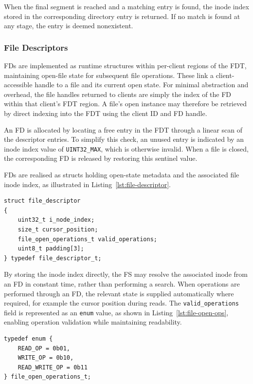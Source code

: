 When the final segment is reached and a matching entry is found, the inode index stored in the corresponding directory entry is returned. If no match is found at any stage, the entry is deemed nonexistent. 

\subsubsection{File Descriptors}
FDs are implemented as runtime structures within per-client regions of the FDT, maintaining open-file state for subsequent file operations. These link a client-accessible handle to a file and its current open state. For minimal abstraction and overhead, the file handles returned to clients are simply the index of the FD within that client’s FDT region. A file’s open instance may therefore be retrieved by direct indexing into the FDT using the client ID and FD handle.

An FD is allocated by locating a free entry in the FDT through a linear scan of the descriptor entries. To simplify this check, an unused entry is indicated by an inode index value of \texttt{UINT32\_MAX}, which is otherwise invalid. When a file is closed, the corresponding FD is released by restoring this sentinel value. 

FDs are realised as structs holding open-state metadata and the associated file inode index, as illustrated in Listing~\ref{lst:file-descriptor}.

\vspace{0.5cm}
\begin{lstlisting}[caption={File descriptor structure.}, label={lst:file-descriptor}]
struct file_descriptor
{
    uint32_t i_node_index;
    size_t cursor_position;
    file_open_operations_t valid_operations;
    uint8_t padding[3];
} typedef file_descriptor_t;
\end{lstlisting}

By storing the inode index directly, the FS may resolve the associated inode from an FD in constant time, rather than performing a search. When operations are performed through an FD, the relevant state is supplied automatically where required, for example the cursor position during reads. The \texttt{valid\_operations} field is represented as an \texttt{enum} value, as shown in Listing~\ref{lst:file-open-ops}, enabling operation validation while maintaining readability. 

\vspace{0.5cm}
\begin{lstlisting}[caption={File open operations enum.}, label={lst:file-open-ops}]
typedef enum {
    READ_OP = 0b01,
    WRITE_OP = 0b10,
    READ_WRITE_OP = 0b11
} file_open_operations_t;
\end{lstlisting}
\vspace{-0.4cm}
